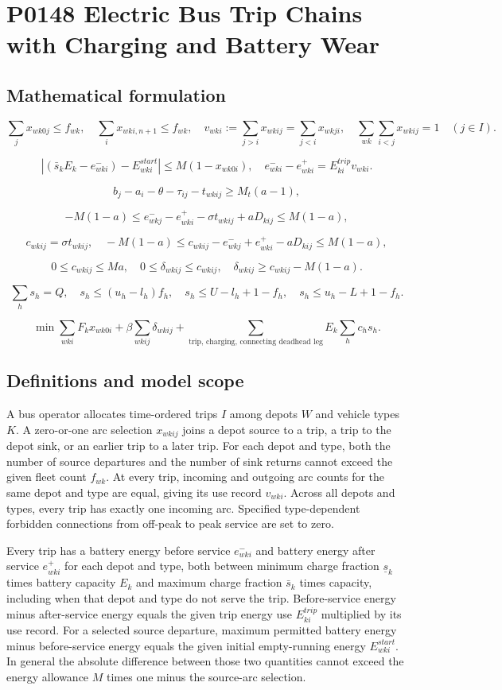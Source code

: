 \documentclass[10pt]{article}
\begin{document}
\section*{P0148 Electric Bus Trip Chains with Charging and Battery Wear}
\subsection*{Mathematical formulation}
\[
\sum_jx_{wk0j}\le f_{wk},\quad\sum_ix_{wki,n+1}\le f_{wk},\quad
v_{wki}:=\sum_{j>i}x_{wkij}=\sum_{j<i}x_{wkji},\quad
\sum_{wk}\sum_{i<j}x_{wkij}=1\quad(j\in I).
\]

\[
|(\bar s_kE_k-e^-_{wki})-E^{start}_{wki}|\le M(1-x_{wk0i}),\quad
e^-_{wki}-e^+_{wki}=E^{trip}_{ki}v_{wki}.
\]

\[
b_j-a_i-\theta-\tau_{ij}-t_{wkij}\ge M_t(a-1),
\]

\[
-M(1-a)\le e^-_{wkj}-e^+_{wki}-\sigma t_{wkij}+aD_{kij}\le M(1-a),
\]

\[
c_{wkij}=\sigma t_{wkij},\quad
-M(1-a)\le c_{wkij}-e^-_{wkj}+e^+_{wki}-aD_{kij}\le M(1-a),
\]

\[
0\le c_{wkij}\le Ma,\quad
0\le\delta_{wkij}\le c_{wkij},\quad
\delta_{wkij}\ge c_{wkij}-M(1-a).
\]

\[
\sum_hs_h=Q,\quad s_h\le(u_h-l_h)f_h,\quad
s_h\le U-l_h+1-f_h,\quad s_h\le u_h-L+1-f_h.
\]

\[
\min\sum_{wki}F_kx_{wk0i}+\beta\sum_{wkij}\delta_{wkij}
+\sum_{\text{trip, charging, connecting deadhead leg}}E_k\sum_hc_hs_h.
\]

\subsection*{Definitions and model scope}
A bus operator allocates time-ordered trips $I$ among depots $W$ and vehicle types $K$. A zero-or-one arc selection $x_{wkij}$ joins a depot source to a trip, a trip to the depot sink, or an earlier trip to a later trip. For each depot and type, both the number of source departures and the number of sink returns cannot exceed the given fleet count $f_{wk}$. At every trip, incoming and outgoing arc counts for the same depot and type are equal, giving its use record $v_{wki}$. Across all depots and types, every trip has exactly one incoming arc. Specified type-dependent forbidden connections from off-peak to peak service are set to zero.

Every trip has a battery energy before service $e^-_{wki}$ and battery energy after service $e^+_{wki}$ for each depot and type, both between minimum charge fraction $\underline s_k$ times battery capacity $E_k$ and maximum charge fraction $\bar s_k$ times capacity, including when that depot and type do not serve the trip. Before-service energy minus after-service energy equals the given trip energy use $E^{trip}_{ki}$ multiplied by its use record. For a selected source departure, maximum permitted battery energy minus before-service energy equals the given initial empty-running energy $E^{start}_{wki}$. In general the absolute difference between those two quantities cannot exceed the energy allowance $M$ times one minus the source-arc selection.
\end{document}

